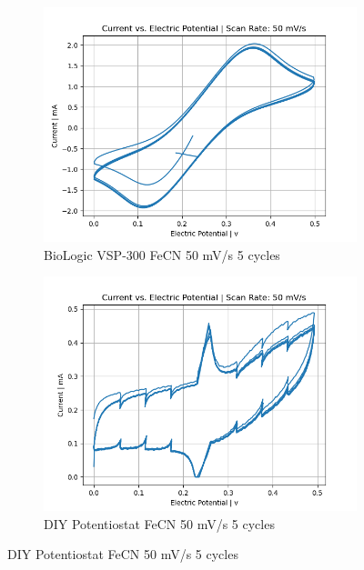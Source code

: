 \documentclass{article}
\begin{document}
\begin{figure}[H]
\begin{subfigure}[b]{0.45\textwidth}
\includegraphics[width=\textwidth]{FECN_50mVs_5cycles_lab.png}
\caption{BioLogic VSP-300 FeCN 50 mV/s 5 cycles}
\end{subfigure}
\hfill
\begin{subfigure}[b]{0.45\textwidth}
\includegraphics[width=\textwidth]{FECN_50mVs_5cycles.png}
\caption{DIY Potentiostat FeCN 50 mV/s 5 cycles}
\end{subfigure}


\end{figure}
\end{document}
